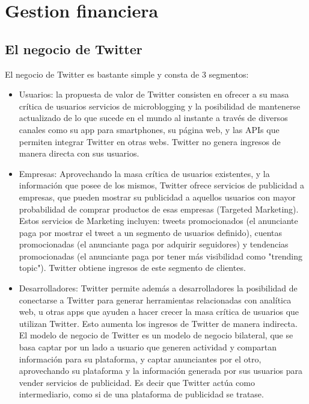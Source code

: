 \section{Gestion financiera}

\subsection{El negocio de Twitter}

El negocio de Twitter es bastante simple y consta de 3 segmentos:

\begin{itemize}


\item Usuarios: la propuesta de valor de Twitter consisten en ofrecer a su masa crítica de usuarios 
servicios de microblogging y la posibilidad de mantenerse actualizado de lo que sucede en el 
mundo  al  instante  a  través  de  diversos  canales  como  su  app  para  smartphones,  su  página 
web, y las APIs que permiten integrar Twitter en otras webs. 
Twitter no genera ingresos de manera directa con sus usuarios.

\item Empresas: Aprovechando la masa crítica de usuarios existentes, y la información que posee 
de  los  mismos,  Twitter  ofrece  servicios  de  publicidad  a  empresas,  que  pueden  mostrar  su 
publicidad a aquellos usuarios con mayor probabilidad  de  comprar  productos  de  esas 
empresas (Targeted  Marketing). Estos servicios de Marketing incluyen: tweets 
promocionados (el anunciante paga por mostrar el tweet a un segmento de usuarios 
definido), cuentas promocionadas (el anunciante paga por adquirir seguidores) y tendencias 
promocionadas (el anunciante paga por tener más visibilidad como "trending topic"). 
Twitter obtiene ingresos de este segmento de clientes.

\item Desarrolladores: Twitter permite además a desarrolladores la posibilidad de conectarse a 
Twitter para generar herramientas relacionadas con analítica web, u otras apps que ayuden a 
hacer crecer la masa crítica de usuarios que utilizan Twitter. Esto aumenta los ingresos de Twitter de manera indirecta. El modelo de negocio de Twitter es un modelo de negocio bilateral, que se basa captar por un lado a usuario que generen actividad y compartan información para su plataforma, y  captar anunciantes por el otro, aprovechando su plataforma y la información generada por sus usuarios para vender servicios de publicidad. Es decir que Twitter actúa como intermediario, como si de una plataforma  de  publicidad  se  tratase.


\end{itemize}

